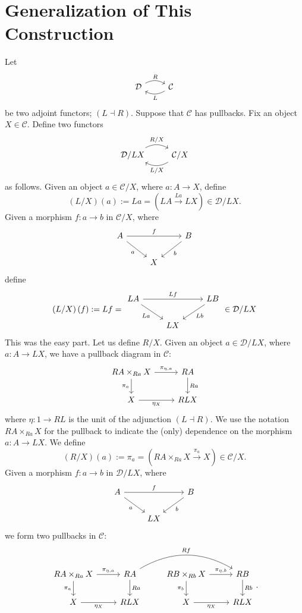 \section{Generalization of This Construction}
Let
\[\begin{tikzcd}
\mathcal{D} \arrow[r, bend left, "R"] & \mathcal{C} \arrow[l, bend left, "L"]
\end{tikzcd}\]
be two adjoint functors; $(L \dashv R)$. Suppose that $\mathcal{C}$ has pullbacks. Fix an object $X \in \mathcal{C}$. Define two functors
\[\begin{tikzcd}
\mathcal{D}/LX \arrow[r, bend left, "R/X"] & \mathcal{C}/X \arrow[l, bend left, "L/X"]
\end{tikzcd}\]
as follows. Given an object $ a \in \mathcal{C}/X$, where $a : A \to X$, define
\[ \left(L/X\right)(a) := La = \left( LA \xrightarrow{La} LX \right) \in \mathcal{D}/LX. \]
Given a morphism $f : a \to b$ in $\mathcal{C}/X$, where
\[\begin{tikzcd}
A \arrow[rr, "f"] \arrow[dr, swap, "a"] & & B \arrow[dl, "b"] \\
& X &  
\end{tikzcd}\]
define
\[ \left(L/X\right)(f) := Lf = \begin{tikzcd} LA \arrow[rr, "Lf"] \arrow[dr, swap, "La"] & & LB \arrow[dl, "Lb"] \\ & LX & \end{tikzcd} \in \mathcal{D}/LX \]
This was the easy part. Let us define $R/X$. Given an object $a \in \mathcal{D}/LX$, where $a : A \to LX$, we have a pullback diagram in $\mathcal{C}$:
\[\begin{tikzcd}
RA \times_{Ra} X \arrow[r, "\pi_{\eta,a}"] \arrow[d, swap, "\pi_a"] & RA \arrow[d, "Ra"] \\
X \arrow[r, swap, "\eta_X"] & RLX 
\end{tikzcd}\]
where $\eta : 1 \to RL$ is the unit of the adjunction $(L \dashv R)$. We use the notation $RA \times_{Ra} X$ for the pullback to indicate the (only) dependence on the morphism $a : A \to LX$. We define
\[ \left( R/X \right)(a) := \pi_a = \left(RA \times_{Ra} X \xrightarrow{\pi_a} X \right) \in \mathcal{C}/X. \]
Given a morphism $f : a \to b$ in $\mathcal{D}/LX$, where
\[\begin{tikzcd}
A \arrow[rr, "f"] \arrow[dr, swap, "a"] & & B \arrow[dl, "b"] \\
& LX &  
\end{tikzcd} \]
we form two pullbacks in $\mathcal{C}$:
\[\begin{tikzcd}
RA \times_{Ra} X \arrow[r, "\pi_{\eta,a}"] \arrow[d, swap, "\pi_a"] & RA \arrow[d, "Ra"] \arrow[rr, bend left, "Rf"] & RB \times_{Rb} X \arrow[r, "\pi_{\eta,b}"] \arrow[d, swap, "\pi_b"] & RB \arrow[d, "Rb"] \\
X \arrow[r, swap, "\eta_X"] & RLX & X \arrow[r, swap, "\eta_X"] & RLX
\end{tikzcd}.\]
